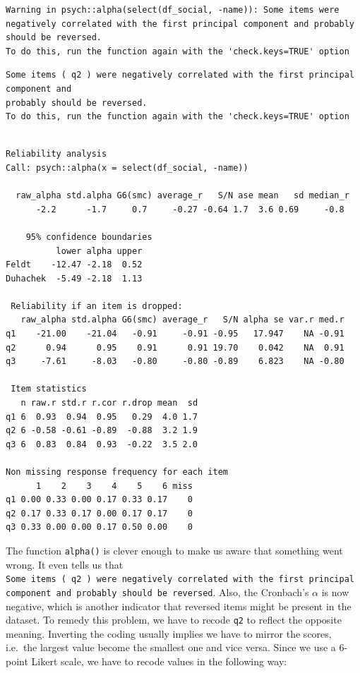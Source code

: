\documentclass[
  letterpaper,
]{krantz}
\begin{document}
\begin{verbatim}
Warning in psych::alpha(select(df_social, -name)): Some items were negatively correlated with the first principal component and probably 
should be reversed.  
To do this, run the function again with the 'check.keys=TRUE' option
\end{verbatim}

\begin{verbatim}
Some items ( q2 ) were negatively correlated with the first principal component and 
probably should be reversed.  
To do this, run the function again with the 'check.keys=TRUE' option
\end{verbatim}

\begin{verbatim}

Reliability analysis   
Call: psych::alpha(x = select(df_social, -name))

  raw_alpha std.alpha G6(smc) average_r   S/N ase mean   sd median_r
      -2.2      -1.7     0.7     -0.27 -0.64 1.7  3.6 0.69     -0.8

    95% confidence boundaries 
          lower alpha upper
Feldt    -12.47 -2.18  0.52
Duhachek  -5.49 -2.18  1.13

 Reliability if an item is dropped:
   raw_alpha std.alpha G6(smc) average_r   S/N alpha se var.r med.r
q1    -21.00    -21.04   -0.91     -0.91 -0.95   17.947    NA -0.91
q2      0.94      0.95    0.91      0.91 19.70    0.042    NA  0.91
q3     -7.61     -8.03   -0.80     -0.80 -0.89    6.823    NA -0.80

 Item statistics 
   n raw.r std.r r.cor r.drop mean  sd
q1 6  0.93  0.94  0.95   0.29  4.0 1.7
q2 6 -0.58 -0.61 -0.89  -0.88  3.2 1.9
q3 6  0.83  0.84  0.93  -0.22  3.5 2.0

Non missing response frequency for each item
      1    2    3    4    5    6 miss
q1 0.00 0.33 0.00 0.17 0.33 0.17    0
q2 0.17 0.33 0.17 0.00 0.17 0.17    0
q3 0.33 0.00 0.00 0.17 0.50 0.00    0
\end{verbatim}

The function \texttt{alpha()} is clever enough to make us aware that
something went wrong. It even tells us that
\texttt{Some\ items\ (\ q2\ )\ were\ negatively\ correlated\ with\ the\ first\ principal\ component\ and\ probably\ should\ be\ reversed}.
Also, the Cronbach's \(\alpha\) is now negative, which is another
indicator that reversed items might be present in the dataset. To remedy
this problem, we have to recode \texttt{q2} to reflect the opposite
meaning. Inverting the coding usually implies we have to mirror the
scores, i.e.~the largest value become the smallest one and vice versa.
Since we use a 6-point Likert scale, we have to recode values in the
following way:
\end{document}
